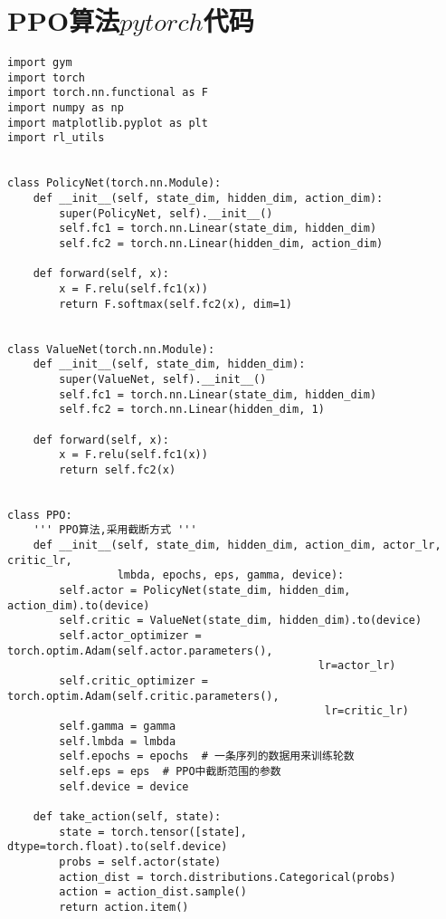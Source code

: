 \section{PPO算法$pytorch$代码}
\begin{lstlisting}
import gym
import torch
import torch.nn.functional as F
import numpy as np
import matplotlib.pyplot as plt
import rl_utils


class PolicyNet(torch.nn.Module):
    def __init__(self, state_dim, hidden_dim, action_dim):
        super(PolicyNet, self).__init__()
        self.fc1 = torch.nn.Linear(state_dim, hidden_dim)
        self.fc2 = torch.nn.Linear(hidden_dim, action_dim)

    def forward(self, x):
        x = F.relu(self.fc1(x))
        return F.softmax(self.fc2(x), dim=1)


class ValueNet(torch.nn.Module):
    def __init__(self, state_dim, hidden_dim):
        super(ValueNet, self).__init__()
        self.fc1 = torch.nn.Linear(state_dim, hidden_dim)
        self.fc2 = torch.nn.Linear(hidden_dim, 1)

    def forward(self, x):
        x = F.relu(self.fc1(x))
        return self.fc2(x)


class PPO:
    ''' PPO算法,采用截断方式 '''
    def __init__(self, state_dim, hidden_dim, action_dim, actor_lr, critic_lr,
                 lmbda, epochs, eps, gamma, device):
        self.actor = PolicyNet(state_dim, hidden_dim, action_dim).to(device)
        self.critic = ValueNet(state_dim, hidden_dim).to(device)
        self.actor_optimizer = torch.optim.Adam(self.actor.parameters(),
                                                lr=actor_lr)
        self.critic_optimizer = torch.optim.Adam(self.critic.parameters(),
                                                 lr=critic_lr)
        self.gamma = gamma
        self.lmbda = lmbda
        self.epochs = epochs  # 一条序列的数据用来训练轮数
        self.eps = eps  # PPO中截断范围的参数
        self.device = device

    def take_action(self, state):
        state = torch.tensor([state], dtype=torch.float).to(self.device)
        probs = self.actor(state)
        action_dist = torch.distributions.Categorical(probs)
        action = action_dist.sample()
        return action.item()


\end{lstlisting}
